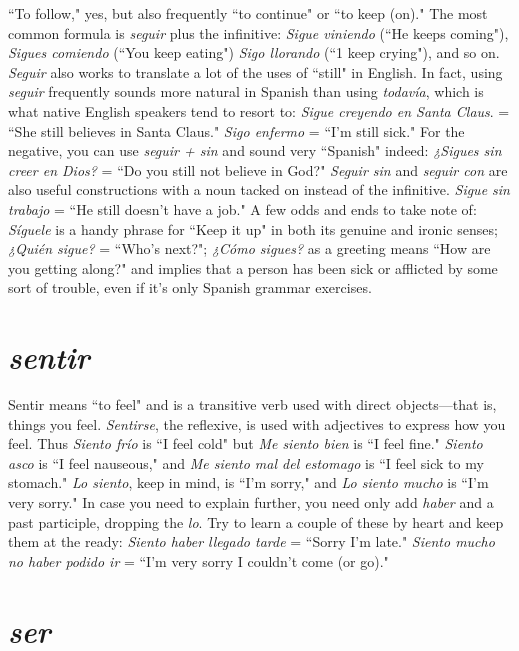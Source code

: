 ``To follow," yes, but also frequently ``to continue" or ``to keep
(on)." The most common formula is \emph{seguir} plus the infinitive: \emph{Sigue
viniendo} (``He keeps coming"), \emph{Sigues comiendo} (``You keep eating")
\emph{Sigo llorando} (``1 keep crying"), and so on. \emph{Seguir} also works to translate a lot of the uses of ``still" in English. In fact, using \emph{seguir} frequently sounds more natural in Spanish than using \emph{todavía}, which
is what native English speakers tend to resort to: \emph{Sigue creyendo en
Santa Claus}. = ``She still believes in Santa Claus." \emph{Sigo enfermo} =
``I'm still sick." For the negative, you can use \emph{seguir + sin} and sound
very ``Spanish" indeed: \emph{¿Sigues sin creer en Dios?} = ``Do you still not
believe in God?" \emph{Seguir sin} and \emph{seguir con} are also useful constructions with a noun tacked on instead of the infinitive. \emph{Sigue sin trabajo}
= ``He still doesn't have a job." A few odds and ends to take note of:
\emph{Síguele} is a handy phrase for ``Keep it up" in both its genuine and
ironic senses; \emph{¿Quién sigue?} = ``Who's next?"; \emph{¿Cómo sigues?} as a
greeting means ``How are you getting along?" and implies that a person
has been sick or afflicted by some sort of trouble, even if it's only Spanish grammar exercises.

\section{\emph{sentir}}

Sentir means ``to feel" and is a transitive verb used with direct
objects---that is, things you feel. \emph{Sentirse}, the reflexive, is used with
adjectives to express how you feel. Thus \emph{Siento frío} is ``I feel cold" but
\emph{Me siento bien} is ``I feel fine." \emph{Siento asco} is ``I feel nauseous," and
\emph{Me siento mal del estomago} is ``I feel sick to my stomach." \emph{Lo siento},
keep in mind, is ``I'm sorry," and \emph{Lo siento mucho} is ``I'm very sorry."
In case you need to explain further, you need only add \emph{haber} and a past
participle, dropping the \emph{lo}. Try to learn a couple of these by heart and
keep them at the ready: \emph{Siento haber llegado tarde} = ``Sorry I'm
late." \emph{Siento mucho no haber podido ir} = ``I'm very sorry I couldn't
come (or go)."

\section{\emph{ser}}

